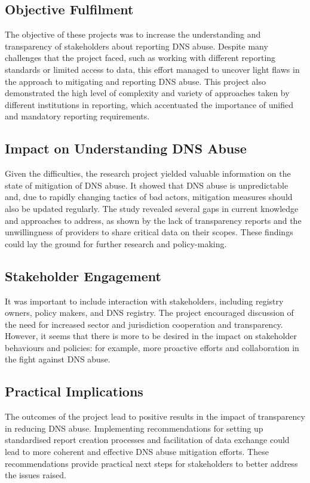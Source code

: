 \subsection{Objective Fulfilment}

The objective of these projects was to increase the understanding and transparency of stakeholders about reporting DNS abuse. Despite many challenges that the project faced, such as working with different reporting standards or limited access to data, this effort managed to uncover light flaws in the approach to mitigating and reporting DNS abuse. This project also demonstrated the high level of complexity and variety of approaches taken by different institutions in reporting, which accentuated the importance of unified and mandatory reporting requirements.

\subsection{Impact on Understanding DNS Abuse}

Given the difficulties, the research project yielded valuable information on the state of mitigation of DNS abuse. It showed that DNS abuse is unpredictable and, due to rapidly changing tactics of bad actors, mitigation measures should also be updated regularly. The study revealed several gaps in current knowledge and approaches to address, as shown by the lack of transparency reports and the unwillingness of providers to share critical data on their scopes. These findings could lay the ground for further research and policy-making.

\subsection{Stakeholder Engagement}

It was important to include interaction with stakeholders, including registry owners, policy makers, and DNS registry. The project encouraged discussion of the need for increased sector and jurisdiction cooperation and transparency. However, it seems that there is more to be desired in the impact on stakeholder behaviours and policies: for example, more proactive efforts and collaboration in the fight against DNS abuse.

\subsection{Practical Implications}
The outcomes of the project lead to positive results in the impact of transparency in reducing DNS abuse. Implementing recommendations for setting up standardised report creation processes and facilitation of data exchange could lead to more coherent and effective DNS abuse mitigation efforts. These recommendations provide practical next steps for stakeholders to better address the issues raised.

